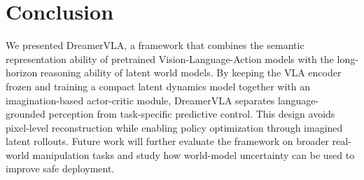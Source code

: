 \section{Conclusion}

We presented DreamerVLA, a framework that combines the semantic representation ability of pretrained Vision-Language-Action models with the long-horizon reasoning ability of latent world models. By keeping the VLA encoder frozen and training a compact latent dynamics model together with an imagination-based actor-critic module, DreamerVLA separates language-grounded perception from task-specific predictive control. This design avoids pixel-level reconstruction while enabling policy optimization through imagined latent rollouts. Future work will further evaluate the framework on broader real-world manipulation tasks and study how world-model uncertainty can be used to improve safe deployment.

